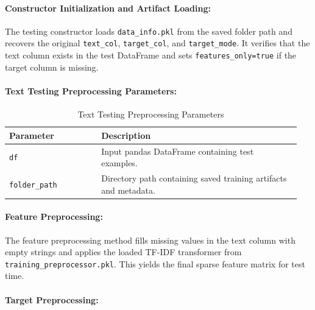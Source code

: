 \paragraph{Constructor Initialization and Artifact Loading:}\par

The testing constructor loads \texttt{data\_info.pkl} from the saved folder path and recovers the original \texttt{text\_col}, \texttt{target\_col}, and \texttt{target\_mode}. It verifies that the text column exists in the test DataFrame and sets \texttt{features\_only=true} if the target column is missing.
\vspace{1cm}
\paragraph{Text Testing Preprocessing Parameters:}\par

\begin{table}[!htbp]
\centering
\small
\renewcommand{\arraystretch}{1.15}
\setlength{\tabcolsep}{4pt}
\caption{Text Testing Preprocessing Parameters}
\label{tab:text_testing_params}
\begin{tabular}{p{0.30\linewidth}p{0.65\linewidth}}
\toprule
\textbf{Parameter} & \textbf{Description} \\
\midrule

\texttt{df} & Input pandas DataFrame containing test examples.\\

\texttt{folder\_path} & Directory path containing saved training artifacts and metadata.\\

\bottomrule
\end{tabular}
\end{table}
\vspace{1cm}
\paragraph{Feature Preprocessing:}\par

The feature preprocessing method fills missing values in the text column with empty strings and applies the loaded TF-IDF transformer from \texttt{training\_preprocessor.pkl}. This yields the final sparse feature matrix for test time.
\vspace{1cm}
\paragraph{Target Preprocessing:}\par


